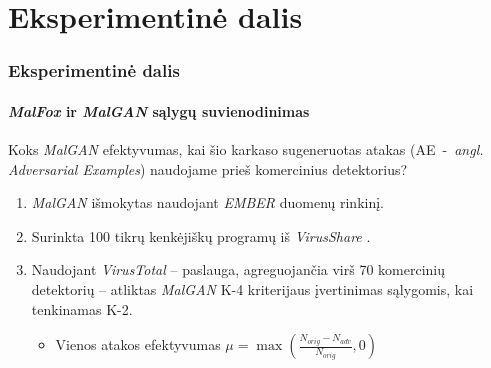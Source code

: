 \section{Eksperimentinė dalis}
\begin{frame}
    \frametitle{Eksperimentinė dalis}
    \framesubtitle{\textit{MalFox} ir \textit{MalGAN} sąlygų suvienodinimas}
    Koks \textit{MalGAN} efektyvumas, kai šio karkaso sugeneruotas atakas (AE~-~\textit{angl. Adversarial Examples}) naudojame prieš komercinius detektorius? \pause
    \vspace{20pt}
    \begin{enumerate}
        \item \textit{MalGAN} išmokytas naudojant \textit{EMBER} \cite{andersonEMBEROpenDataset2018} duomenų rinkinį. \pause
        \item Surinkta 100 tikrų kenkėjiškų programų iš \textit{VirusShare}
              \cite{VirusSharecom}. \pause
        \item Naudojant \textit{VirusTotal} \cite{VirusTotalHome} -- paslauga, agreguojančia
              virš 70 komercinių detektorių -- atliktas \textit{MalGAN} K-4 kriterijaus
              įvertinimas sąlygomis, kai tenkinamas K-2. \pause
              \begin{itemize}
                  \vspace{10pt}
                  \item Vienos atakos efektyvumas $\mu = \max{\left(\frac{N_{orig} - N_{adv}}{N_{orig}}, 0\right)}$
              \end{itemize}
    \end{enumerate}

\end{frame}

